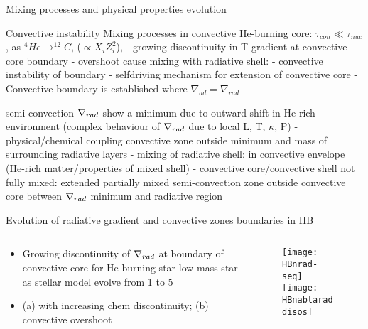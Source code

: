 \begin{frame}{Mixing processes and physical properties evolution}
\begin{block}{Convective instability}
Mixing processes in convective He-burning core: $\tau_{con}\ll\tau_{nuc}$, as $^4He\to^{12}C$,  ($\propto X_iZ_i^2$), \xaumenta{\nrad{}} - growing discontinuity in T gradient at convective core boundary - overshoot cause mixing with radiative shell: \xaumenta{\kappa} - convective instability of boundary - selfdriving mechanism for extension of convective core - Convective boundary is established where $\nabla_{ad}=\nabla_{rad}$
\end{block}
\begin{block}{semi-convection}
$\nabla_{rad}{}$ show a minimum due to outward shift in He-rich environment (complex behaviour of $\nabla_{rad}$ due to local L, T, $\kappa$, P) - physical/chemical coupling convective zone outside minimum and mass of surrounding radiative layers - mixing of radiative shell: \xdiminuisce{\nad{}} in convective envelope (He-rich matter/properties of mixed shell) - convective core/convective shell not fully mixed: extended partially mixed semi-convection zone outside convective core between $\nabla_{rad}$ minimum and radiative region
\end{block}
\end{frame}

\begin{frame}{Evolution of radiative gradient and convective zones boundaries in HB}
\begin{columns}[T]
\begin{column}{0.5\textwidth}
\begin{itemize}
\item Growing discontinuity of $\nabla_{rad}$ at boundary of convective core for He-burning star low mass star as stellar model evolve from 1 to 5
\item (a) with increasing chem discontinuity; (b) convective overshoot
\end{itemize}
\end{column}
\begin{column}{0.5\textwidth}
\begin{figure}[!ht]
\texttt{[image: HBnrad-seq]}\label{fig:HBnrad-seq}	\texttt{[image: HBnablaraddisos]}\label{fig:HBnablaraddisos}
\end{figure}
\end{column}
\end{columns}
\end{frame}

